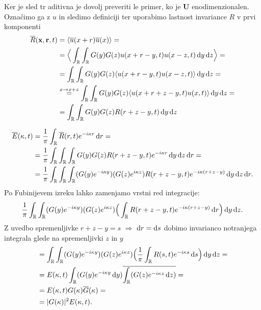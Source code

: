 \documentclass[mat2, tisk]{fmfdelo}
\newcommand{\R}{\mathbb R}
\newcommand{\bd}{\textbf}
\begin{document}
\begin{dokaz}
Ker je sled tr aditivna je dovolj preveriti le primer, ko je 
$\bd{U}$ enodimenzionalen. Označimo ga z $u$ in sledimo definiciji 
ter uporabimo lastnost invariance $R$ v prvi komponenti
\begin{align*}
\overline{R}(\bd{x}, \bd{r}, t) &= \langle \overline{u}(x + r) \overline{u}(x) \rangle = \\
&= \Big\langle\int_\R \int_\R G(y) G(z) u(x+r-y, t) u(x-z, t) \dif y \dif z\Big\rangle = \\
&= \int_\R \int_\R G(y) G(z) \langle u(x+r-y, t) u(x-z, t) \rangle \dif y \dif z = \\
&\stackrel{x \rightarrow x + z}{=} \int_\R \int_\R G(y) G(z) \langle u(x+r+z-y, t) u(x, t) \rangle \dif y \dif z = \\
&= \int_\R \int_\R G(y) G(z) R(r+z-y, t) \dif y \dif z
\end{align*}

\begin{align*}
\overline{E}(\kappa, t) &= \frac{1}{\pi} \int_\R \overline{R}(r, t) e^{-i\kappa r} \dif r = \\
&= \frac{1}{\pi}\int_{\R} \int_{\R} \int_\R G(y) G(z) R(r+z-y,t) e^{-i\kappa r} \dif y \dif z \dif r = \\
&= \frac{1}{\pi}\int_{\R} \int_{\R} \int_\R (G(y) e^{-i\kappa y}) (G(z) e^{i\kappa z}) R(r+z-y,t) e^{-i\kappa(r+z-y)} \dif y \dif z \dif r.
\end{align*}
Po Fubinijevem izreku lahko zamenjamo vrstni red integracije: 
\begin{align*}
\frac{1}{\pi}\int_{\R} \int_\R (G(y) e^{-i\kappa y}) (G(z) e^{i\kappa z}) \Big(\int_{\R} R(r+z-y,t) e^{-i\kappa(r+z-y)} \dif r \Big) \dif y \dif z.
\end{align*}
Z uvedbo spremenljivke $r + z - y = s$ $\Longrightarrow$ $\dif r = \dif s$ dobimo invarianco notranjega integrala glede na
spremenljivki $z$ in $y$
\begin{align*}
&= \int_{\R} \int_\R (G(y) e^{-i\kappa y}) (G(z) e^{i\kappa z}) \Big(\frac{1}{\pi}\int_{\R} R(s,t) e^{-i\kappa s} \dif s \Big) \dif y \dif z = \\
&= E(\kappa, t) \int_\R (G(y) e^{-i\kappa y}\dif y) \overline{\int_{\R} (G(z) e^{-i\kappa z} \dif z)}  = \\
&= E(\kappa, t) G(\kappa) \overline{G}(\kappa) = \\
&= |G(\kappa)|^2 E(\kappa, t).
\end{align*}
\end{dokaz}
\end{document}
